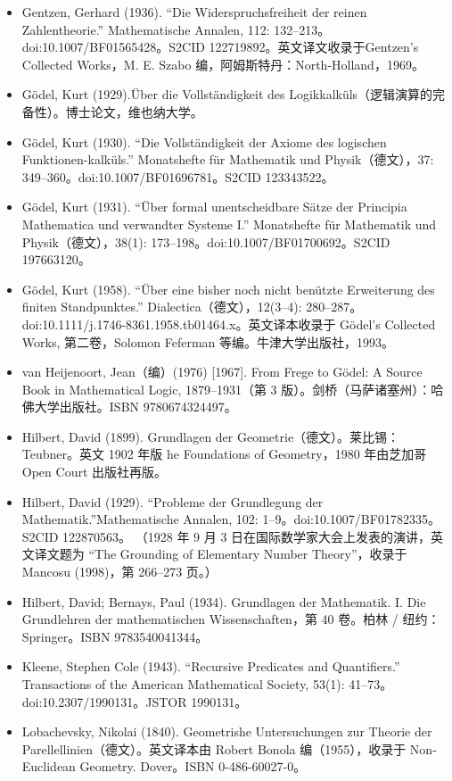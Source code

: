 \begin{itemize}
  \item Gentzen, Gerhard (1936). “Die Widerspruchsfreiheit der reinen Zahlentheorie.” Mathematische Annalen, 112: 132–213。doi:10.1007/BF01565428。S2CID 122719892。英文译文收录于Gentzen’s Collected Works，M. E. Szabo 编，阿姆斯特丹：North-Holland，1969。
  \item Gödel, Kurt (1929).Über die Vollständigkeit des Logikkalküls（逻辑演算的完备性）。博士论文，维也纳大学。
  \item Gödel, Kurt (1930). “Die Vollständigkeit der Axiome des logischen Funktionen-kalküls.” Monatshefte für Mathematik und Physik（德文），37: 349–360。doi:10.1007/BF01696781。S2CID 123343522。
  \item Gödel, Kurt (1931). “Über formal unentscheidbare Sätze der Principia Mathematica und verwandter Systeme I.” Monatshefte für Mathematik und Physik（德文），38(1): 173–198。doi:10.1007/BF01700692。S2CID 197663120。
  \item Gödel, Kurt (1958). “Über eine bisher noch nicht benützte Erweiterung des finiten Standpunktes.” Dialectica（德文），12(3–4): 280–287。doi:10.1111/j.1746-8361.1958.tb01464.x。英文译本收录于 Gödel’s Collected Works, 第二卷，Solomon Feferman 等编。牛津大学出版社，1993。
  \item van Heijenoort, Jean（编）(1976) [1967]. From Frege to Gödel: A Source Book in Mathematical Logic, 1879–1931（第 3 版）。剑桥（马萨诸塞州）：哈佛大学出版社。ISBN 9780674324497。
  \item Hilbert, David (1899). Grundlagen der Geometrie（德文）。莱比锡：Teubner。英文 1902 年版 he Foundations of Geometry，1980 年由芝加哥 Open Court 出版社再版。
  \item Hilbert, David (1929). “Probleme der Grundlegung der Mathematik.”Mathematische Annalen, 102: 1–9。doi:10.1007/BF01782335。S2CID 122870563。  
        （1928 年 9 月 3 日在国际数学家大会上发表的演讲，英文译文题为 “The Grounding of Elementary Number Theory”，收录于 Mancosu (1998)，第 266–273 页。）
  \item Hilbert, David; Bernays, Paul (1934). Grundlagen der Mathematik. I. Die Grundlehren der mathematischen Wissenschaften，第 40 卷。柏林 / 纽约：Springer。ISBN 9783540041344。
  \item Kleene, Stephen Cole (1943). “Recursive Predicates and Quantifiers.” Transactions of the American Mathematical Society, 53(1): 41–73。doi:10.2307/1990131。JSTOR 1990131。
  \item Lobachevsky, Nikolai (1840). Geometrishe Untersuchungen zur Theorie der Parellellinien（德文）。英文译本由 Robert Bonola 编（1955），收录于 Non-Euclidean Geometry. Dover。ISBN 0-486-60027-0。

\end{itemize}
